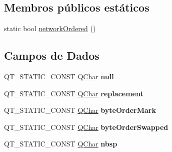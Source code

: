 \subsection*{Membros públicos estáticos}
\begin{DoxyCompactItemize}
\item 
static bool \hyperlink{class_q_char_a5e3c5d1077dd6dc5d0b88d11d7cbc59d}{network\-Ordered} ()
\end{DoxyCompactItemize}
\subsection*{Campos de Dados}
\begin{DoxyCompactItemize}
\item 
\hypertarget{class_q_char_a8286b2cea0ce5a6883aafc6358375981}{Q\-T\-\_\-\-S\-T\-A\-T\-I\-C\-\_\-\-C\-O\-N\-S\-T \hyperlink{class_q_char}{Q\-Char} {\bfseries null}}\label{class_q_char_a8286b2cea0ce5a6883aafc6358375981}

\item 
\hypertarget{class_q_char_a5a38f912e27dcfb982a8adc60315bd6d}{Q\-T\-\_\-\-S\-T\-A\-T\-I\-C\-\_\-\-C\-O\-N\-S\-T \hyperlink{class_q_char}{Q\-Char} {\bfseries replacement}}\label{class_q_char_a5a38f912e27dcfb982a8adc60315bd6d}

\item 
\hypertarget{class_q_char_abd2441e850a4ee32fd6d3af356dbf33f}{Q\-T\-\_\-\-S\-T\-A\-T\-I\-C\-\_\-\-C\-O\-N\-S\-T \hyperlink{class_q_char}{Q\-Char} {\bfseries byte\-Order\-Mark}}\label{class_q_char_abd2441e850a4ee32fd6d3af356dbf33f}

\item 
\hypertarget{class_q_char_a6b1bb9db67e7ee00b91896bb55eb5e37}{Q\-T\-\_\-\-S\-T\-A\-T\-I\-C\-\_\-\-C\-O\-N\-S\-T \hyperlink{class_q_char}{Q\-Char} {\bfseries byte\-Order\-Swapped}}\label{class_q_char_a6b1bb9db67e7ee00b91896bb55eb5e37}

\item 
\hypertarget{class_q_char_a4af0fe1a0ae50e56956ff9ff92c5ed9a}{Q\-T\-\_\-\-S\-T\-A\-T\-I\-C\-\_\-\-C\-O\-N\-S\-T \hyperlink{class_q_char}{Q\-Char} {\bfseries nbsp}}\label{class_q_char_a4af0fe1a0ae50e56956ff9ff92c5ed9a}

\end{DoxyCompactItemize}
